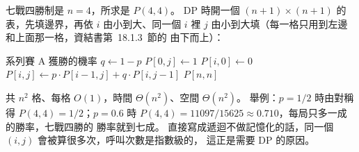 \begin{pastsoln}
七戰四勝制是 $n = 4$，所求是 $P(4, 4)$。 DP 時開一個 $(n + 1) \times (n + 1)$ 的表，先填邊界，再依
$i$ 由小到大、同一個 $i$ 裡 $j$ 由小到大填（每一格只用到左邊和上面那一格，資結書第~18.1.3~節的
由下而上）：

\begin{pseudo}{系列賽 A 獲勝的機率}
    \State $q \gets 1 - p$
        \State $P[0, j] \gets 1$
    \EndFor
        \State $P[i, 0] \gets 0$
            \State $P[i, j] \gets p \cdot P[i-1, j] + q \cdot P[i, j-1]$
        \EndFor
    \EndFor
    \State \Return $P[n, n]$
\EndFunction
\end{pseudo}

共 $n^2$ 格、每格 $O(1)$，時間 $\Theta(n^2)$、空間 $\Theta(n^2)$。 舉例：$p = 1/2$ 時由對稱得
$P(4, 4) = 1/2$；$p = 0.6$ 時 $P(4, 4) = 11097/15625 \approx 0.710$，每局只多一成的勝率，七戰四勝的
勝率就到七成。 直接寫成遞迴不做記憶化的話，同一個 $(i, j)$ 會被算很多次，呼叫次數是指數級的，
這正是需要 DP 的原因。
\end{pastsoln}
